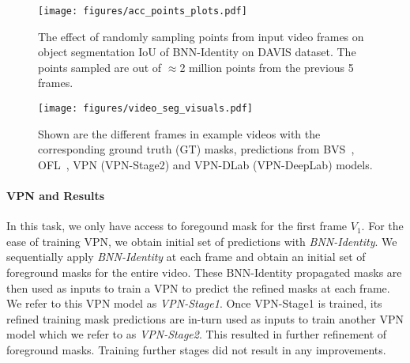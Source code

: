 \begin{figure}[t!]
\begin{center}
  \centerline{\texttt{[image: figures/acc\_points\_plots.pdf]}}
    {The effect of randomly sampling points from input video frames on object
    segmentation IoU of BNN-Identity on DAVIS dataset.
    The points sampled are out of $\approx$2 million points from the previous 5 frames.}
    \label{fig:acc_vs_points}
\end{center}
\vspace{-0.8cm}
\end{figure}

\begin{figure}[th!]
\begin{center}
  \centerline{\texttt{[image: figures/video\_seg\_visuals.pdf]}}
    {Shown are the different frames in example videos with the corresponding
    ground truth (GT) masks, predictions from BVS~\cite{marki2016bilateral},
    OFL~\cite{tsaivideo}, VPN (VPN-Stage2) and VPN-DLab (VPN-DeepLab) models.}
    \label{fig:video_seg_visuals}
\end{center}
\vspace{-1.0cm}
\end{figure}

\vspace{-0.5cm}
\paragraph{VPN and Results} In this task, we only have access to foregound mask
for the first frame $V_1$.
For the ease of training VPN, we obtain initial set of predictions with
\emph{BNN-Identity}. We sequentially apply \emph{BNN-Identity} at each frame
and obtain an initial set of foreground masks for the entire video.
These BNN-Identity propagated masks are then used as inputs to train a VPN to
predict the refined masks at each frame. We refer to this
VPN model as \emph{VPN-Stage1}. Once VPN-Stage1 is trained, its refined training
mask predictions are in-turn used as inputs to train another VPN model which we
refer to as \emph{VPN-Stage2}. This resulted in further refinement of foreground
masks. Training further stages did not result in any improvements.

